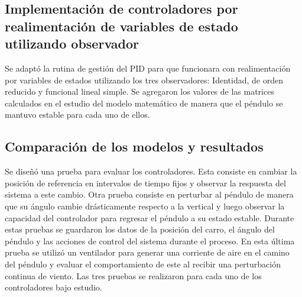 \subsection{Implementación de controladores por realimentación de variables de estado utilizando observador}

Se adaptó la rutina de gestión del PID para que funcionara con realimentación por variables de estados utilizando los tres observadores: Identidad, de orden reducido y funcional lineal simple. Se agregaron los valores de las matrices calculados en el estudio del modelo matemático de manera que el péndulo se mantuvo estable para cada uno de ellos.

\subsection{Comparación de los modelos y resultados}

Se diseñó una prueba para evaluar los controladores. Esta consiste en cambiar la posición de referencia en intervalos de tiempo fijos y observar la respuesta del sistema a este cambio. Otra prueba consiste en perturbar al péndulo de manera que su ángulo cambie drásticamente respecto a la vertical y luego observar la capacidad del controlador para regresar el péndulo a su estado estable. Durante estas pruebas se guardaron los datos de la posición del carro, el ángulo del péndulo y las acciones de control del sistema durante el proceso. En esta última prueba se utilizó un ventilador para generar una corriente de aire en el camino del péndulo y evaluar el comportamiento de este al recibir una perturbación continua de viento. Las tres pruebas se realizaron para cada uno de los controladores bajo estudio.
